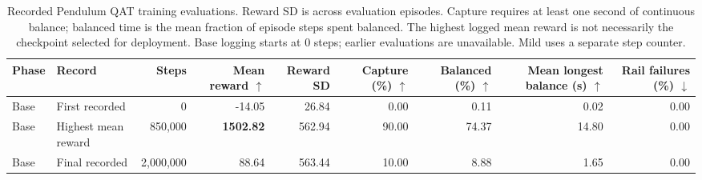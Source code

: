 \begin{landscape}
\begin{table}[htbp]
\centering
\small
\caption{Recorded Pendulum QAT training evaluations. Reward SD is across evaluation episodes. Capture requires at least one second of continuous balance; balanced time is the mean fraction of episode steps spent balanced. The highest logged mean reward is not necessarily the checkpoint selected for deployment. Base logging starts at 0 steps; earlier evaluations are unavailable. Mild uses a separate step counter.}
\label{tab:pendulum-training-summary}
\begin{adjustbox}{max width=\linewidth}
\begin{tabular}{llrrrrrrr}
\toprule
Phase & Record & Steps & Mean reward $\uparrow$ & Reward SD & Capture (\%) $\uparrow$ & Balanced (\%) $\uparrow$ & Mean longest balance (s) $\uparrow$ & Rail failures (\%) $\downarrow$ \\
\midrule
Base & First recorded & 0 & -14.05 & 26.84 & 0.00 & 0.11 & 0.02 & 0.00 \\
Base & Highest mean reward & 850,000 & \textbf{1502.82} & 562.94 & 90.00 & 74.37 & 14.80 & 0.00 \\
Base & Final recorded & 2,000,000 & 88.64 & 563.44 & 10.00 & 8.88 & 1.65 & 0.00 \\
\bottomrule
\end{tabular}
\end{adjustbox}
\end{table}
\end{landscape}
